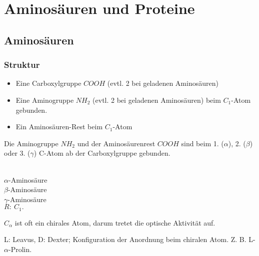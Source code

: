 \section{Aminosäuren und Proteine}
 
\subsection{Aminosäuren}

\subsubsection{Struktur}

\begin{itemize}
	\item Eine Carboxylgruppe $COOH$ (evtl. 2 bei geladenen Aminosäuren)
	\item Eine Aminogruppe $NH_2$ (evtl. 2 bei geladenen Aminosäuren) beim $C_1$-Atom gebunden.
	\item Ein Aminosäuren-Rest beim $C_1$-Atom
\end{itemize}

\begin{definition}
	Die Aminogruppe $NH_2$ und der Aminosäurenrest $COOH$ sind beim 1. ($\alpha$), 2. ($\beta$) oder 3. ($\gamma$) C-Atom ab der Carboxylgruppe gebunden.
\end{definition}

\leavevmode \\

\setatomsep{2em}
 $\alpha$-Aminosäure\\

 $\beta$-Aminosäure\\

 $\gamma$-Aminosäure\\

$R:\ C_1.$

\begin{definition}
	$C_\alpha$ ist oft ein chirales Atom, darum tretet die optische Aktivität auf.
\end{definition}

\begin{definition}
	L: Leavus, D: Dexter; Konfiguration der Anordnung beim chiralen Atom. Z. B. L-$\alpha$-Prolin.
\end{definition}



